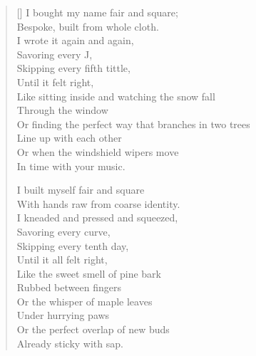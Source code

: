 \begin{verse}[\textwidth]
I bought my name fair and square;\\
Bespoke, built from whole cloth.\\
I wrote it again and again,\\
Savoring every J,\\
Skipping every fifth tittle,\\
Until it felt right,\\
Like sitting inside and watching the snow fall\\
\vin Through the window\\
Or finding the perfect way that branches in two trees\\
\vin Line up with each other\\
Or when the windshield wipers move\\
\vin In time with your music.

I built myself fair and square\\
With hands raw from coarse identity.\\
I kneaded and pressed and squeezed,\\
Savoring every curve,\\
Skipping every tenth day,\\
Until it all felt right,\\
Like the sweet smell of pine bark\\
\vin Rubbed between fingers\\
Or the whisper of maple leaves\\
\vin Under hurrying paws\\
Or the perfect overlap of new buds\\
\vin Already sticky with sap.
\end{verse}
